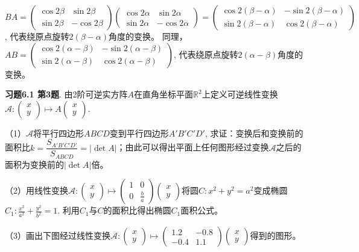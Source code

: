 $BA = \begin{pmatrix} \cos 2\beta & \sin 2\beta \\ \sin 2\beta & -\cos 2\beta \end{pmatrix} \begin{pmatrix} \cos 2\alpha & \sin 2\alpha \\ \sin 2\alpha & -\cos 2\alpha \end{pmatrix} = \begin{pmatrix} \cos 2(\beta-\alpha) & -\sin 2(\beta-\alpha) \\ \sin 2(\beta-\alpha) & \cos 2(\beta-\alpha) \end{pmatrix}$, 代表绕原点旋转$2(\beta-\alpha)$角度的变换。
同理，$AB = \begin{pmatrix} \cos 2(\alpha-\beta) & -\sin 2(\alpha-\beta) \\ \sin 2(\alpha-\beta) & \cos 2(\alpha-\beta) \end{pmatrix}$, 代表绕原点旋转$2(\alpha-\beta)$角度的变换。

\newpageorvspace


{\bf 习题6.1 第3题}. 由2阶可逆实方阵$A$在直角坐标平面$\mathbb{R}^2$上定义可逆线性变换$\mathscr{A}: \begin{pmatrix} x \\ y \end{pmatrix} \mapsto A \begin{pmatrix} x \\ y \end{pmatrix}$.

（1）$\mathscr{A}$将平行四边形$ABCD$变到平行四边形$A'B'C'D'$, 求证：变换后和变换前的面积比$k = \dfrac{S_{A'B'C'D'}}{S_{ABCD}} = |\det A|$；由此可以得出平面上任何图形经过变换$\mathscr{A}$之后的面积为变换前的$|\det A|$倍。

（2）用线性变换$\mathscr{A}: \begin{pmatrix} x \\ y \end{pmatrix} \mapsto \begin{pmatrix} 1 & 0 \\ 0 & \frac{b}{a} \end{pmatrix} \begin{pmatrix} x \\ y \end{pmatrix}$将圆$C: x^2 + y^2 = a^2$变成椭圆$C_1: \frac{x^2}{a^2} + \frac{y^2}{b^2} = 1$. 利用$C_1$与$C$的面积比得出椭圆$C_1$面积公式。

（3）画出下图经过线性变换$\mathscr{A}: \begin{pmatrix} x \\ y \end{pmatrix} \mapsto \begin{pmatrix} 1.2 & -0.8 \\ -0.4 & 1.1 \end{pmatrix} \begin{pmatrix} x \\ y \end{pmatrix}$得到的图形。

